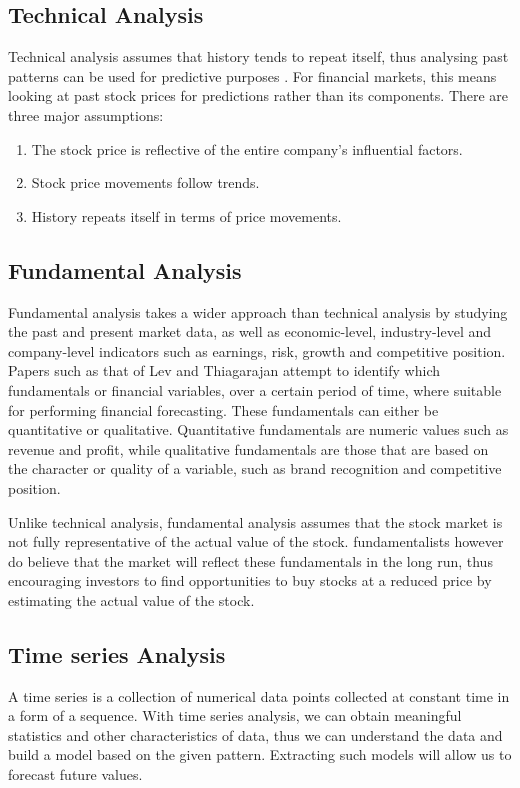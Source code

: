 \documentclass{UoYCSproject}
\begin{document}
\subsection{Technical Analysis}
Technical analysis assumes that history tends to repeat itself, thus analysing past patterns can be used for predictive purposes \cite{levy1966conceptual}. For financial markets, this means looking at past stock prices for predictions rather than its components. There are three major assumptions:
\begin{enumerate}
    \item The stock price is reflective of the entire company's influential factors.
    \item Stock price movements follow trends.
    \item History repeats itself in terms of price movements.
\end{enumerate}

\subsection{Fundamental Analysis}
Fundamental analysis takes a wider approach than technical analysis by studying the past and present market data, as well as economic-level, industry-level and company-level indicators such as earnings, risk, growth and competitive position. Papers such as that of Lev and Thiagarajan \cite{lev1993fundamental} attempt to identify which fundamentals or financial variables, over a certain period of time, where suitable for performing financial forecasting. These fundamentals can either be quantitative or qualitative. Quantitative fundamentals are numeric values such as revenue and profit, while qualitative fundamentals are those that are based on the character or quality of a variable, such as brand recognition and competitive position. 

Unlike technical analysis, fundamental analysis assumes that the stock market is not fully representative of the actual value of the stock. fundamentalists however do believe that the market will reflect these fundamentals in the long run, thus encouraging investors to find opportunities to buy stocks at a reduced price by estimating the actual value of the stock. 

\subsection{Time series Analysis}
A time series is a collection of numerical data points collected at constant time in a form of a sequence. With time series analysis, we can obtain meaningful statistics and other characteristics of data, thus we can understand the data and build a model based on the given pattern. Extracting such models will allow us to forecast future values. 
\end{document}
